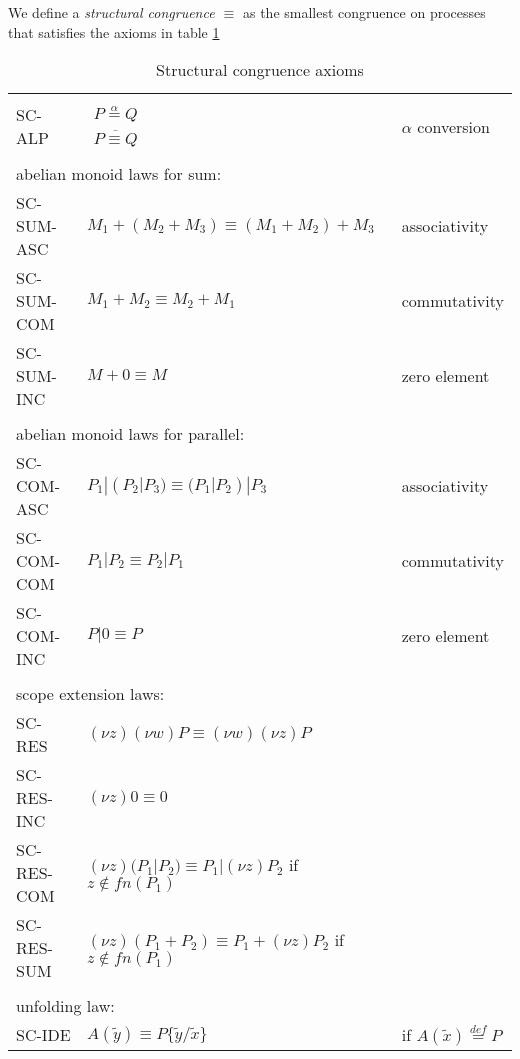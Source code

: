 
\begin{definition}
  We define a \emph{structural congruence $\equiv$} as the smallest congruence on processes that satisfies the axioms in table \ref{structuralcongrunce}
  \begin{table}
    \begin{tabular}{lll}
      \hline\\
	SC-ALP&$\begin{array}{c}P \stackrel{\alpha}{=} Q\\\overline{P\equiv Q}\end{array}$&$\alpha$ conversion
      \\\\
	\multicolumn{3}{l}{abelian monoid laws for sum:}
      \\
	SC-SUM-ASC& $M_{1}+(M_{2}+M_{3})\equiv (M_{1}+M_{2})+M_{3}$ &associativity
      \\
	SC-SUM-COM& $M_{1}+M_{2}\equiv M_{2}+M_{1}$ &commutativity
      \\
	SC-SUM-INC& $M+0\equiv M$&zero element
      \\\\
	\multicolumn{3}{l}{abelian monoid laws for parallel:}
      \\
	SC-COM-ASC& $P_{1}|(P_{2}|P_{3})\equiv (P_{1}|P_{2})|P_{3}$ &associativity
      \\
	SC-COM-COM& $P_{1}|P_{2}\equiv P_{2}|P_{1}$ &commutativity
      \\
	SC-COM-INC& $P|0\equiv P$&zero element
      \\\\
	\multicolumn{3}{l}{scope extension laws:}
      \\
	SC-RES& $(\nu z) (\nu w) P \equiv (\nu w) (\nu z) P$ &
      \\
	SC-RES-INC& $(\nu z) 0 \equiv 0$ &
      \\
	SC-RES-COM& $(\nu z) (P_{1}|P_{2}) \equiv P_{1}|(\nu z) P_{2}$ if $z\notin fn(P_{1})$&
      \\
	SC-RES-SUM& $(\nu z) (P_{1}+P_{2}) \equiv P_{1}+(\nu z) P_{2}$ if $z\notin fn(P_{1})$&
      \\\\
	\multicolumn{3}{l}{unfolding law:}
      \\
	SC-IDE&$A(\tilde{y})\equiv P\{\tilde{y}/\tilde{x}\}$&if $A(\tilde{x})\stackrel{def}{=}P$
      \\\hline
    \end{tabular}
    \caption{Structural congruence axioms}
    \label{structuralcongrunce}
  \end{table}
\end{definition}

